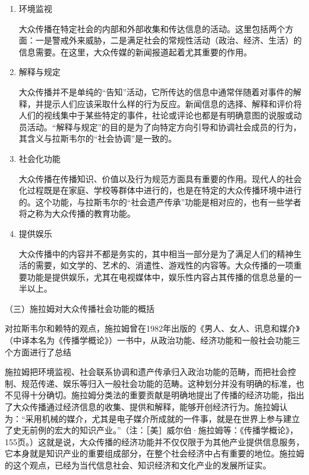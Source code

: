 \documentclass[UTF8,12pt]{ctexart}
\numberwithin{equation}{section} %
\numberwithin{figure}{section}
\numberwithin{table}{section}
\begin{document}
	\begin{enumerate}
		\item 环境监视
		
		大众传播在特定社会的内部和外部收集和传达信息的活动。这里包括两个方面：一是警戒外来威胁，二是满足社会的常规性活动（政治、经济、生活）的信息需要。在这里，大众传媒的新闻报道起着尤其重要的作用。
		
		\item 解释与规定
		
		大众传播并不是单纯的“告知”活动，它所传达的信息中通常伴随着对事件的解释，并提示人们应该采取什么样的行为反应。新闻信息的选择、解释和评价将人们的视线集中于某些特定的事件，社论或评论也都是有明确意图的说服或动员活动。“解释与规定”的目的是为了向特定方向引导和协调社会成员的行为，其含义与拉斯韦尔的“社会协调”是一致的。
		
		\item 社会化功能
		
		大众传播在传播知识、价值以及行为规范方面具有重要的作用。现代人的社会化过程既是在家庭、学校等群体中进行的，也是在特定的大众传播环境中进行的。这个功能，与拉斯韦尔的“社会遗产传承”功能是相对应的，也有一些学者将之称为大众传播的教育功能。
		
		\item 提供娱乐
		
		大众传播中的内容并不都是务实的，其中相当一部分是为了满足人们的精神生活的需要，如文学的、艺术的、消遣性、游戏性的内容等。大众传播的一项重要功能是提供娱乐，尤其在电视媒体中，娱乐性内容占其传播的信息总量的一半以上。
		
	\end{enumerate}
	
	（三）施拉姆对大众传播社会功能的概括
	
	对拉斯韦尔和赖特的观点，施拉姆曾在1982年出版的《男人、女人、讯息和媒介》（中译本名为《传播学概论》）一书中，从政治功能、经济功能和一般社会功能三个方面进行了总结
	
	施拉姆把环境监视、社会联系协调和遗产传承归入政治功能的范畴，而把社会控制、规范传递、娱乐等归入一般社会功能的范畴。这种划分并没有明确的标准，也不见得十分确切。施拉姆分类法的重要贡献是明确地提出了传播的经济功能，指出了大众传播通过经济信息的收集、提供和解释，能够开创经济行为。施拉姆认为：“采用机械的媒介，尤其是电子媒介所成就的一件事，就是在世界上参与建立了史无前例的宏大的知识产业。”（注：［美］威尔伯·施拉姆等：《传播学概论》，155页。）这就是说，大众传播的经济功能并不仅仅限于为其他产业提供信息服务，它本身就是知识产业的重要组成部分，在整个社会经济中占有重要的地位。施拉姆的这个观点，已经为当代信息社会、知识经济和文化产业的发展所证实。
	
\end{document}

